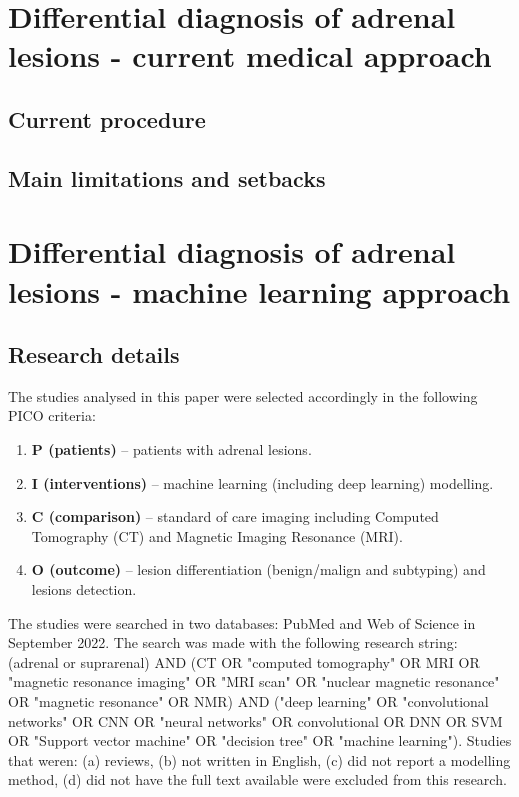 \documentclass{article}
\begin{document}
\section{Differential diagnosis of adrenal lesions - current medical approach}

\subsection{Current procedure}

\subsection{Main limitations and setbacks}

\section{Differential diagnosis of adrenal lesions - machine learning approach}

\subsection{Research details}

The studies analysed in this paper were selected accordingly in the following PICO criteria:

\begin{enumerate}
    \item[] \textbf{P (patients) }– patients with adrenal lesions.
    \item[] \textbf{I (interventions) }– machine learning (including deep learning) modelling.
    \item[] \textbf{C (comparison) }– standard of care imaging including Computed Tomography (CT) and Magnetic Imaging Resonance (MRI).
    \item[] \textbf{O (outcome) }– lesion differentiation (benign/malign and subtyping) and lesions detection.
\end{enumerate}

The studies were searched in two databases: PubMed and Web of Science in September 2022. The search was made with the following research string: (adrenal or suprarenal) AND
(CT OR "computed tomography" OR MRI OR "magnetic resonance imaging" OR "MRI scan" OR "nuclear magnetic resonance" OR "magnetic resonance" OR NMR)
AND ("deep learning" OR "convolutional networks" OR CNN OR "neural networks" OR convolutional OR DNN OR SVM OR "Support vector machine" OR "decision tree" OR "machine learning").
Studies that weren: (a) reviews, (b) not written in English, (c) did not report a modelling method, (d) did not have the full text available were excluded from this research.
\end{document}
